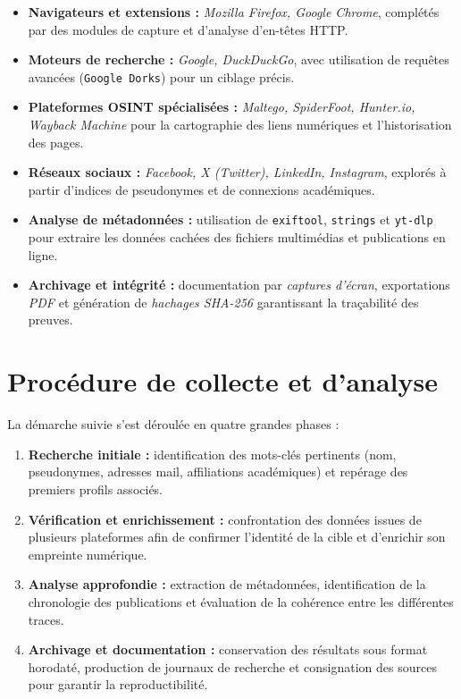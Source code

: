 \documentclass[a4paper,12pt]{report}
\begin{document}
\begin{itemize}
	\item \textbf{Navigateurs et extensions :} \textit{Mozilla Firefox, Google Chrome}, complétés par des modules de capture et d’analyse d’en-têtes HTTP.
	\item \textbf{Moteurs de recherche :} \textit{Google, DuckDuckGo}, avec utilisation de requêtes avancées (\texttt{Google Dorks}) pour un ciblage précis.
	\item \textbf{Plateformes OSINT spécialisées :} \textit{Maltego, SpiderFoot, Hunter.io, Wayback Machine} pour la cartographie des liens numériques et l’historisation des pages.
	\item \textbf{Réseaux sociaux :} \textit{Facebook, X (Twitter), LinkedIn, Instagram}, explorés à partir d’indices de pseudonymes et de connexions académiques.
	\item \textbf{Analyse de métadonnées :} utilisation de \texttt{exiftool}, \texttt{strings} et \texttt{yt-dlp} pour extraire les données cachées des fichiers multimédias et publications en ligne.
	\item \textbf{Archivage et intégrité :} documentation par \textit{captures d’écran}, exportations \textit{PDF} et génération de \textit{hachages SHA-256} garantissant la traçabilité des preuves.
\end{itemize}

\section{Procédure de collecte et d’analyse}

La démarche suivie s’est déroulée en quatre grandes phases :

\begin{enumerate}
	\item \textbf{Recherche initiale :} identification des mots-clés pertinents (nom, pseudonymes, adresses mail, affiliations académiques) et repérage des premiers profils associés.
	\item \textbf{Vérification et enrichissement :} confrontation des données issues de plusieurs plateformes afin de confirmer l’identité de la cible et d’enrichir son empreinte numérique.
	\item \textbf{Analyse approfondie :} extraction de métadonnées, identification de la chronologie des publications et évaluation de la cohérence entre les différentes traces.
	\item \textbf{Archivage et documentation :} conservation des résultats sous format horodaté, production de journaux de recherche et consignation des sources pour garantir la reproductibilité.
\end{enumerate}
\end{document}
